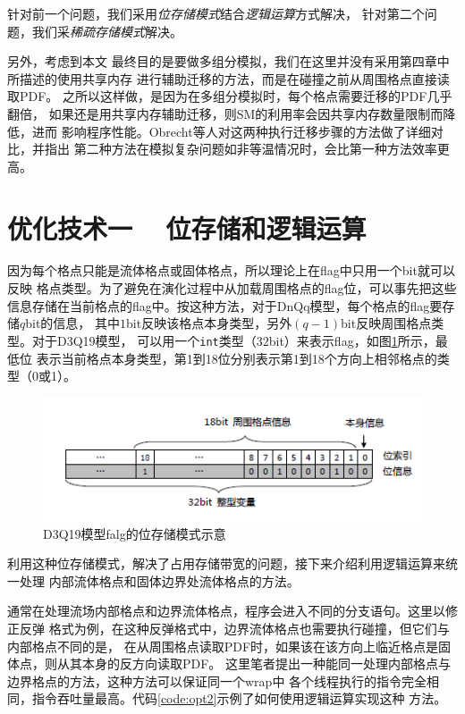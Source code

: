 针对前一个问题，我们采用\textit{位存储模式}结合\textit{逻辑运算}方式解决，
针对第二个问题，我们采\textit{稀疏存储模式}解决。

另外，考虑到本文
最终目的是要做多组分模拟，我们在这里并没有采用第四章中所描述的使用共享内存
进行辅助迁移的方法，而是在碰撞之前从周围格点直接读取PDF。
之所以这样做，是因为在多组分模拟时，每个格点需要迁移的PDF几乎翻倍，
如果还是用共享内存辅助迁移，则SM的利用率会因共享内存数量限制而降低，进而
影响程序性能。Obrecht等人对这两种执行迁移步骤的方法做了详细对比，并指出
第二种方法在模拟复杂问题如非等温情况时，会比第一种方法效率更高。

\section{优化技术一 ~ 位存储和逻辑运算} \label{sec:opt1}
因为每个格点只能是流体格点或固体格点，所以理论上在flag中只用一个bit就可以反映
格点类型。为了避免在演化过程中从加载周围格点的flag位，可以事先把这些
信息存储在当前格点的flag中。按这种方法，对于DnQq模型，每个格点的flag要存储$q$bit的信息，
其中$1$bit反映该格点本身类型，另外$(q-1)$bit反映周围格点类型。对于D3Q19模型，
可以用一个\texttt{int}类型（$32$bit）来表示flag，如图\ref{fig:bitmap}所示，最低位
表示当前格点本身类型，第1到18位分别表示第1到18个方向上相邻格点的类型（0或1）。
\begin{figure}[htpb]
  \centering
  \includegraphics[]{img/bitmap}
  \caption{D3Q19模型falg的位存储模式示意}
  \label{fig:bitmap}
\end{figure}
利用这种位存储模式，解决了占用存储带宽的问题，接下来介绍利用逻辑运算来统一处理
内部流体格点和固体边界处流体格点的方法。

通常在处理流场内部格点和边界流体格点，程序会进入不同的分支语句。这里以修正反弹
格式为例，在这种反弹格式中，边界流体格点也需要执行碰撞，但它们与内部格点不同的是，
在从周围格点读取PDF时，如果该在该方向上临近格点是固体点，则从其本身的反方向读取PDF。
这里笔者提出一种能同一处理内部格点与边界格点的方法，这种方法可以保证同一个wrap中
各个线程执行的指令完全相同，指令吞吐量最高。代码\ref{code:opt2}示例了如何使用逻辑运算实现这种
方法。

